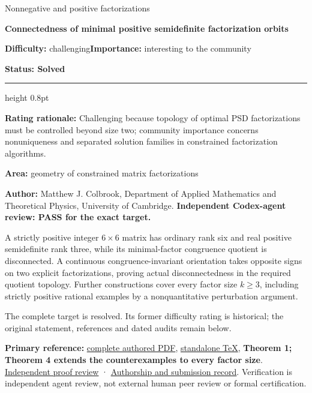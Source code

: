 \documentclass[11pt,a4paper]{article}
\makeatletter
\renewcommand{\subsection}{\Needspace{4\baselineskip}\@startsection{subsection}{2}{0pt}{9pt plus 1pt minus 1pt}{3pt}{\sffamily\bfseries\normalsize\color{ink}}}
\makeatother
\begin{document}
{\sffamily\small\color{muted}Nonnegative and positive
factorizations\par}
\vspace{3pt}
{\raggedright{}\sffamily\bfseries\fontsize{21}{24}\selectfont\color{ink}Connectedness
of minimal positive semidefinite factorization orbits\par}
\vspace{7pt}
{\sffamily\small\textbf{Difficulty:} challenging\quad\textbf{Importance:} interesting
to the community\par}
{\sffamily\small\bfseries\color{accent}Status: Solved\par}
\vspace{4pt}
{\color{accent}\hrule height 0.8pt}
\vspace{6pt}
\textbf{Rating rationale:} Challenging because topology of optimal PSD
factorizations must be controlled beyond size two; community importance
concerns nonuniqueness and separated solution families in constrained
factorization algorithms.

\textbf{Area:} geometry of constrained matrix factorizations

\subsection{Resolution --- 2026-09-11}\label{resolution-2026-09-11}

\textbf{Author:} Matthew J. Colbrook, Department of Applied Mathematics
and Theoretical Physics, University of Cambridge. \textbf{Independent
Codex-agent review: PASS for the exact target.}

A strictly positive integer \(6\times6\) matrix has ordinary rank six
and real positive semidefinite rank three, while its minimal-factor
congruence quotient is disconnected. A continuous congruence-invariant
orientation takes opposite signs on two explicit factorizations, proving
actual disconnectedness in the required quotient topology. Further
constructions cover every factor size \(k\ge3\), including strictly
positive rational examples by a nonquantitative perturbation argument.

The complete target is resolved. Its former difficulty rating is
historical; the original statement, references and dated audits remain
below.

\textbf{Primary reference:}
\href{https://github.com/ajt60gaibb/OpenProblemsInNLA/blob/main/references/colbrook-factorization-2026-09-11/manuscripts/PF-02_disconnected_orbits.pdf}{complete
authored PDF},
\href{https://github.com/ajt60gaibb/OpenProblemsInNLA/blob/main/references/colbrook-factorization-2026-09-11/manuscripts/PF-02_disconnected_orbits.tex}{standalone
TeX}, \textbf{Theorem 1; Theorem 4 extends the counterexamples to every
factor size}.
\href{https://github.com/ajt60gaibb/OpenProblemsInNLA/blob/main/references/colbrook-factorization-2026-09-11/verification/reviews/PF-02-review.md}{Independent
proof review} ·
\href{https://github.com/ajt60gaibb/OpenProblemsInNLA/blob/main/references/colbrook-factorization-2026-09-11/README.md}{Authorship
and submission record}. Verification is independent agent review, not
external human peer review or formal certification.
\end{document}
